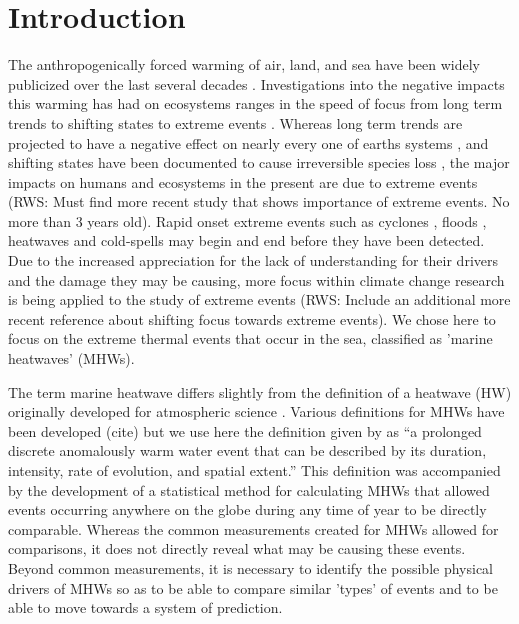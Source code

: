 \documentclass[a4paper,10pt,review]{elsarticle}
\begin{document}
\section{Introduction}
The anthropogenically forced warming of air, land, and sea have been widely publicized over the last several decades \citep[e.g.]{Manabe1967, Sawyer1972, Hansen1981, Rosenzweig2008}. Investigations into the negative impacts this warming has had on ecosystems ranges in the speed of focus from long term trends \citep[e.g.]{} to shifting states \citep[e.g.]{Travis2003} to extreme events \citep[e.g.]{Easterling2000}. Whereas long term trends are projected to have a negative effect on nearly every one of earths systems \citep{IPCC2014}, and shifting states have been documented to cause irreversible species loss \citep{Thomas2004}, the major impacts on humans and ecosystems in the present are due to extreme events \citep{Easterling2000} (RWS: Must find more recent study that shows importance of extreme events. No more than 3 years old). Rapid onset extreme events such as cyclones \citep[e.g.]{}, floods \citep[e.g.]{}, heatwaves \citep[e.g.]{Garrabou2009} and cold-spells \citep[e.g.]{Gunter1941, Lirman2011} may begin and end before they have been detected. Due to the increased appreciation for the lack of understanding for their drivers and the damage they may be causing, more focus within climate change research is being applied to the study of extreme events \citep{Jentsch2007}(RWS: Include an additional more recent reference about shifting focus towards extreme events). We chose here to focus on the extreme thermal events that occur in the sea, classified as 'marine heatwaves' (MHWs).

The term marine heatwave differs slightly from the definition of a heatwave (HW) originally developed for atmospheric science \citep{Perkins2013}. Various definitions for MHWs have been developed (cite) but we use here the definition given by \citet{Hobday2016} as ``a prolonged discrete anomalously warm water event that can be described by its duration, intensity, rate of evolution, and spatial extent.'' This definition was accompanied by the development of a statistical method for calculating MHWs that allowed events occurring anywhere on the globe during any time of year to be directly comparable. Whereas the common measurements created for MHWs allowed for comparisons, it does not directly reveal what may be causing these events. Beyond common measurements, it is necessary to identify the possible physical drivers of MHWs so as to be able to compare similar 'types' of events and to be able to move towards a system of prediction. 
\end{document}

